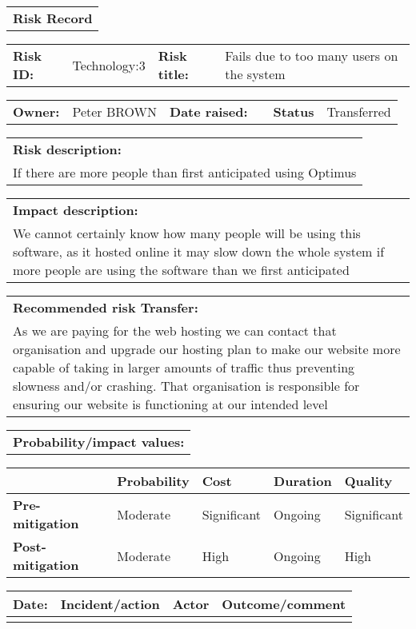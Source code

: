 \begin{table}
	\begin{tabularx}{\textwidth}{| X |}
		\hline
		\textbf{Risk Record} \\
	\end{tabularx}
	\begin{tabularx}{\textwidth}{| l | X | l | X |}
		\hline
		\textbf{Risk ID:} & Technology:3 & \textbf{Risk title:} & Fails due to too many users on the system \\
	\end{tabularx}
	\begin{tabularx}{\textwidth}{| l | X | l | X | l | X |}
		\hline
		\textbf{Owner:} & Peter BROWN & \textbf{Date raised:} &  & \textbf{Status} & Transferred \\
	\end{tabularx}
	\begin{tabularx}{\textwidth}{| X |}
		\hline
		\textbf{Risk description:} \\ If there are more people than first anticipated using Optimus  \\
	\end{tabularx}
	\begin{tabularx}{\textwidth}{| X |}
		\hline
		\textbf{Impact description:} \\ We cannot certainly know how many people will be using this software, as it hosted online it may slow down the whole system if more people are using the software than we first anticipated \\
	\end{tabularx}
	\begin{tabularx}{\textwidth}{| X |}
		\hline
		\textbf{Recommended risk Transfer:} \\ As we are paying for the web hosting we can contact that organisation and upgrade our hosting plan to make our website more capable of taking in larger amounts of traffic thus preventing slowness and/or crashing. That organisation is responsible for ensuring our website is functioning at our intended level \\
	\end{tabularx}
	\begin{tabularx}{\textwidth}{| X |}
		\hline
		\textbf{Probability/impact values:} \\
	\end{tabularx}
	\begin{tabularx}{\textwidth}{| l | l | X | X | X |}
		\hline
		 &  \textbf{Probability} & \textbf{Cost} & \textbf{Duration} & \textbf{Quality} \\ \hline
		\textbf{Pre-mitigation} & Moderate & Significant & Ongoing & Significant \\ \hline
		\textbf{Post-mitigation} & Moderate & High & Ongoing & High \\ \hline
	\end{tabularx}
	\begin{tabularx}{\textwidth}{| l | X | l | X |}
		\hline
		\textbf{Date:} & \textbf{Incident/action} & \textbf{Actor} & \textbf{Outcome/comment} \\ \hline
		 &  &  &  \\ \hline
	\end{tabularx}
\end{table}


